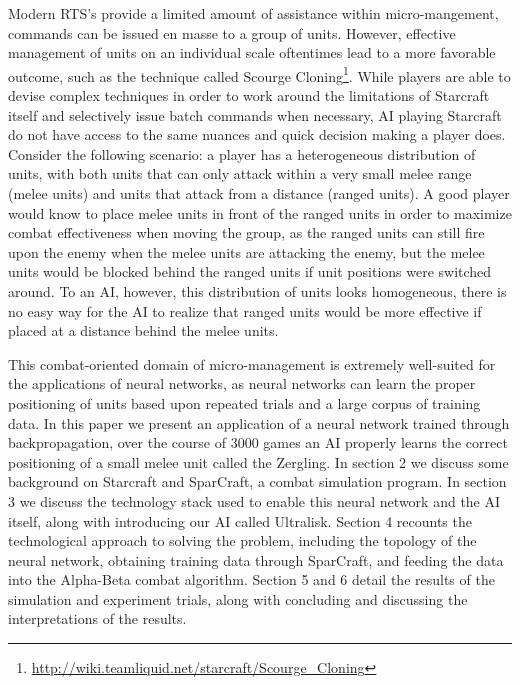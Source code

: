 \documentclass[twocolumn]{article}
\begin{document}
Modern RTS's provide a limited amount of assistance within micro-mangement, commands can be issued en masse to a group of units. However, effective management of units on an individual scale oftentimes lead to a more favorable outcome, such as the technique called Scourge Cloning\footnote{\tiny{\url{http://wiki.teamliquid.net/starcraft/Scourge_Cloning}}}. While players are able to devise complex techniques in order to work around the limitations of Starcraft itself and selectively issue batch commands when necessary, AI playing Starcraft do not have access to the same nuances and quick decision making a player does. Consider the following scenario: a player has a heterogeneous distribution of units, with both units that can only attack within a very small melee range (melee units) and units that attack from a distance (ranged units). A good player would know to place melee units in front of the ranged units in order to maximize combat effectiveness when moving the group, as the ranged units can still fire upon the enemy when the melee units are attacking the enemy, but the melee units would be blocked behind the ranged units if unit positions were switched around. To an AI, however, this distribution of units looks homogeneous, there is no easy way for the AI to realize that ranged units would be more effective if placed at a distance behind the melee units. 

This combat-oriented domain of micro-management is extremely well-suited for the applications of neural networks, as neural networks can learn the proper positioning of units based upon repeated trials and a large corpus of training data. In this paper we present an application of a neural network trained through backpropagation, over the course of 3000 games an AI properly learns the correct positioning of a small melee unit called the Zergling. In section 2 we discuss some background on Starcraft and SparCraft, a combat simulation program. In section 3 we discuss the technology stack used to enable this neural network and the AI itself, along with introducing our AI called Ultralisk. Section 4 recounts the technological approach to solving the problem, including the topology of the neural network, obtaining training data through SparCraft, and feeding the data into the Alpha-Beta combat algorithm. Section 5 and 6 detail the results of the simulation and experiment trials, along with concluding and discussing the interpretations of the results. 
\end{document}
